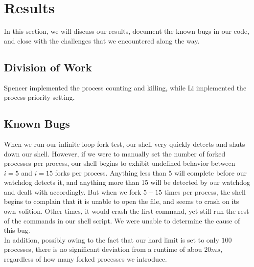 \documentclass{article}
\begin{document}



\section{Results}

In this section, we will discuss our results, document the known bugs in our 
code, and close with the challenges that we encountered along the way.

\subsection{Division of Work}
Spencer implemented the process counting and killing, while Li implemented the
process priority setting.

\subsection{Known Bugs}
When we run our infinite loop fork test, our shell very quickly detects and
shuts down our shell. However, if we were to manually set the number of forked 
processes per process, our shell begins to exhibit undefined behavior between 
$i = 5$ and $i = 15$ forks per process. Anything less than 5 will complete
before our watchdog detects it, and anything more than 15 will be detected by
our watchdog and dealt with accordingly. But when we fork $5 - 15$ times per
process, the shell begins to complain that it is unable to open the file, and
seems to crash on its own volition. Other times, it would crash the first 
command, yet still run the rest of the commands in our shell script. We were 
unable to determine the cause of this bug.\\
In addition, possibly owing to the fact that our hard limit is set to only
$100$ processes, there is no significant deviation from a runtime of abou
$20ms$, regardless of how many forked processes we introduce.
\end{document}
